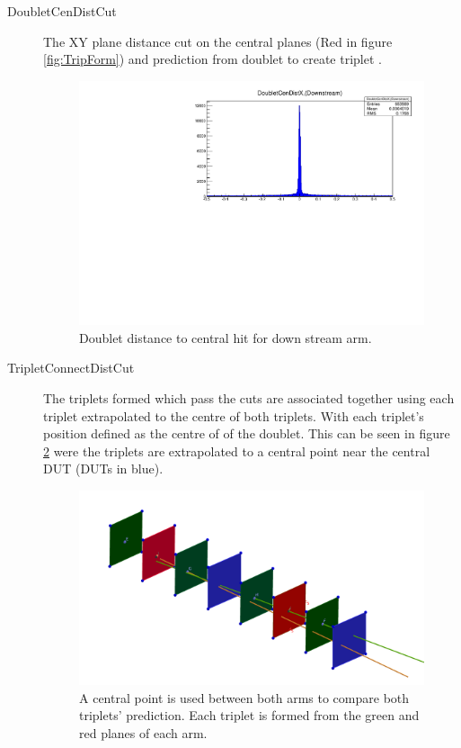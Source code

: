 \begin{description}
\item[DoubletCenDistCut]  The XY plane distance cut on the central planes (Red in figure \ref{fig:TripForm}) and prediction from doublet to create triplet . 

\begin{figure}[H]
\centering
\includegraphics[width=1.0\linewidth]{figures/DoubletCenDist-442.pdf}
\caption{Doublet distance to central hit for down stream arm.}
\label{fig:DoubCen}
\end{figure}

\item[TripletConnectDistCut]  The triplets formed which pass the cuts are associated together using each triplet extrapolated to the centre of both triplets. With each triplet's position defined as the centre of of the doublet. This can be seen in figure \ref{fig:TripCon} were the triplets are extrapolated to a central point near the central DUT (DUTs in blue).

\begin{figure}[H]
\centering
\includegraphics[width=1.0\linewidth]{figures/tripletsconnect.png}
\caption{A central point is used between both arms to compare both triplets' prediction. Each triplet is formed from the green and red planes of each arm. }
\label{fig:TripCon}
\end{figure}


\end{description}

